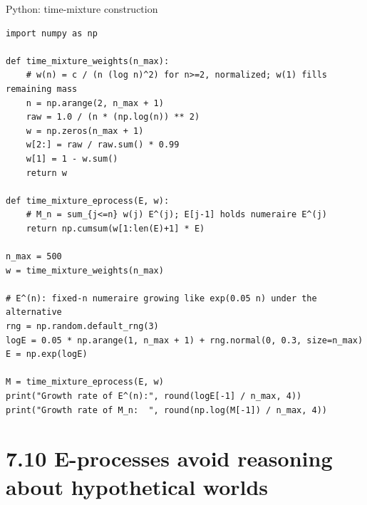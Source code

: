 \documentclass[aspectratio=169,10pt]{beamer}
\begin{document}
\begin{frame}[fragile]{Python: time-mixture construction}

\begin{lstlisting}
import numpy as np

def time_mixture_weights(n_max):
    # w(n) = c / (n (log n)^2) for n>=2, normalized; w(1) fills remaining mass
    n = np.arange(2, n_max + 1)
    raw = 1.0 / (n * (np.log(n)) ** 2)
    w = np.zeros(n_max + 1)
    w[2:] = raw / raw.sum() * 0.99
    w[1] = 1 - w.sum()
    return w

def time_mixture_eprocess(E, w):
    # M_n = sum_{j<=n} w(j) E^(j); E[j-1] holds numeraire E^(j)
    return np.cumsum(w[1:len(E)+1] * E)

n_max = 500
w = time_mixture_weights(n_max)

# E^(n): fixed-n numeraire growing like exp(0.05 n) under the alternative
rng = np.random.default_rng(3)
logE = 0.05 * np.arange(1, n_max + 1) + rng.normal(0, 0.3, size=n_max)
E = np.exp(logE)

M = time_mixture_eprocess(E, w)
print("Growth rate of E^(n):", round(logE[-1] / n_max, 4))
print("Growth rate of M_n:  ", round(np.log(M[-1]) / n_max, 4))
\end{lstlisting}

\end{frame}

\section{7.10 E-processes avoid reasoning about hypothetical worlds}
\end{document}
